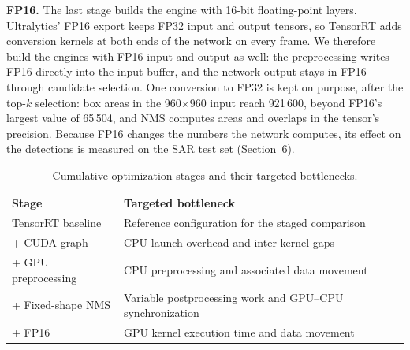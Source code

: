 \textbf{FP16.} The last stage builds the engine with 16-bit floating-point
layers. Ultralytics' FP16 export keeps FP32 input and output tensors, so
TensorRT adds conversion kernels at both ends of the network on every frame.
We therefore build the engines with FP16 input and output as well: the
preprocessing writes FP16 directly into the input buffer, and the network
output stays in FP16 through candidate selection. One conversion to FP32 is
kept on purpose, after the top-$k$ selection: box areas in the
960$\times$960 input reach 921\,600, beyond FP16's largest value of 65\,504,
and NMS computes areas and overlaps in the tensor's precision. Because FP16
changes the numbers the network computes, its effect on the detections is
measured on the SAR test set (Section~6).

\begin{table}[H]
  \centering
  \small
  \begin{tabular}{@{}p{}p{}@{}}
    \toprule
    Stage & Targeted bottleneck \\
    \midrule
    TensorRT baseline & Reference configuration for the staged comparison \\
    + CUDA graph & CPU launch overhead and inter-kernel gaps \\
    + GPU preprocessing & CPU preprocessing and associated data movement \\
    + Fixed-shape NMS & Variable postprocessing work and GPU--CPU synchronization \\
    + FP16 & GPU kernel execution time and data movement \\
    \bottomrule
  \end{tabular}
  \vspace{0.5em}
  \caption{Cumulative optimization stages and their targeted bottlenecks.}
  \label{tab:optimization-stages}
\end{table}
\vspace{-0.6em}
